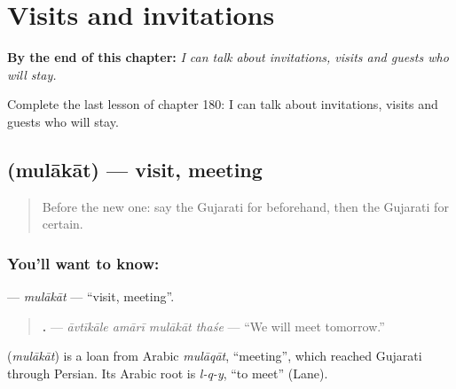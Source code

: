 
\chapter{Visits and invitations}
\label{ch:gu-visits-and-invitations}

\begin{chapteropening}
\textbf{By the end of this chapter:} \emph{I can talk about invitations, visits and guests who will stay.}

Complete the last lesson of chapter 180: I can talk about invitations, visits and guests who will stay.
\end{chapteropening}

\section[\texorpdfstring{\gu{મુલાકાત} (mulākāt)}{મુલાકાત (mulākāt)}]{ (mulākāt) — visit, meeting}

\label{lesson:GU-C180-mulakat}



\begin{quote}
Before the new one: say the Gujarati for beforehand, then the Gujarati for certain.
\end{quote}

\subsection*{You'll want to know: }
\textbf{} — \emph{mulākāt} — \textquotedblleft{}visit, meeting\textquotedblright{}.

\begin{quote}
\textbf{   .} — \emph{āvtīkāle amārī mulākāt thaśe} — \textquotedblleft{}We will meet tomorrow.\textquotedblright{}
\end{quote}

\begin{cousinweb}
\textbf{} (\emph{mulākāt}) is a loan from Arabic \emph{mulāqāt}, \textquotedblleft{}meeting\textquotedblright{}, which reached Gujarati through Persian. Its Arabic root is \emph{l-q-y}, \textquotedblleft{}to meet\textquotedblright{} (Lane).
\end{cousinweb}

